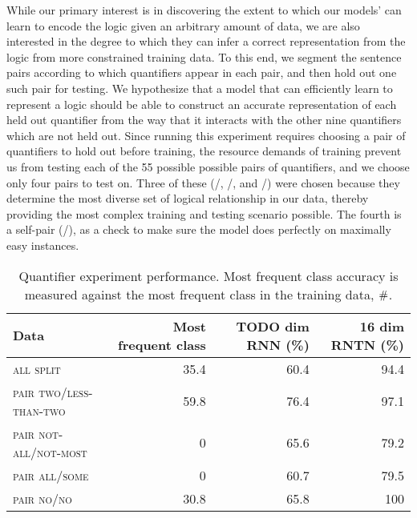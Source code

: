 
While our primary interest is in discovering the extent to which our
models' can learn to encode the logic given an arbitrary amount of
data, we are also interested in the degree to which they can infer a
correct representation from the logic from more constrained training
data. To this end, we segment the sentence pairs according to which
quantifiers appear in each pair, and then hold out one such pair for
testing. We hypothesize that a model that can efficiently learn to
represent a logic should be able to construct an accurate
representation of each held out quantifier from the way that it
interacts with the other nine quantifiers which are not held
out. Since running this experiment requires choosing a pair of
quantifiers to hold out before training, the resource demands of
training prevent us from testing each of the 55 possible possible
pairs of quantifiers, and we choose only four pairs to test on.  Three
of these (/, /, and
/) were chosen because they determine the most
diverse set of logical relationship in our data, thereby providing the
most complex training and testing scenario possible. The fourth is a
self-pair (/), as a check to make sure the model does
perfectly on maximally easy instances.

\begin{table}[htp]
  \centering
  \begin{tabular}{ l rrr }
    \toprule
    Data & Most frequent class & TODO dim RNN (\%) & 16 dim RNTN (\%)\\
    \midrule
    \textsc{all split}	& 35.4 &	60.4&	94.4
    \\[1ex]    
    \textsc{pair two/less-than-two}	& 59.8 &	76.4 &	97.1 \\
    \textsc{pair not-all/not-most}	&0 &	   65.6  &	79.2 \\
    \textsc{pair all/some}	& 0& 60.7  &	79.5 \\
    \textsc{pair no/no}	& 30.8 &	65.8 &	100 \\
    \bottomrule
  \end{tabular}
  \caption{Quantifier experiment performance. 
    Most frequent class accuracy is measured against the most frequent class in the training data, $\mathbin{\#}$.}
  \label{resultstable}
\end{table} 


